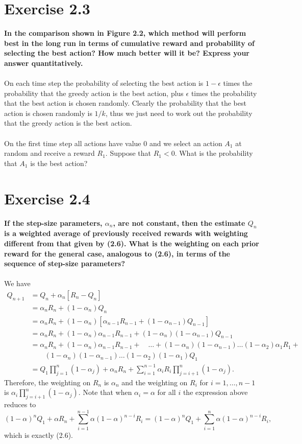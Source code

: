 \documentclass[a4paper,11pt]{article}
\numberwithin{equation}{section}
\theoremstyle{remark}
\begin{document}
\section{Exercise 2.3}

\textbf{In the comparison shown in Figure 2.2, which method will perform best in the long run in terms of cumulative reward and probability of selecting the best action? How much better will it be? Express your answer quantitatively.}
\\ \\ 
On each time step the probability of selecting the best action is $1-\epsilon$ times the probability that the greedy action is the best action, plus $\epsilon$ times the probability that the best action is chosen randomly. Clearly the probability that the best action is chosen randomly is $1/k$, thus we just need to work out the probability that the greedy action is the best action. 
\\ \\ 
On the first time step all actions have value 0 and we select an action $A_1$ at random and receive a reward $R_1$. Suppose that $R_1 < 0$. What is the probability that $A_1$ is the best action? 


\section{Exercise 2.4}

\textbf{If the step-size parameters, $\alpha_n$, are not constant, then the estimate $Q_n$ is a weighted average of previously received rewards with weighting different from that given by (2.6). What is the weighting on each prior reward for the general case, analogous to (2.6), in terms of the sequence of step-size parameters?}
\\ \\ 
We have
\begin{align*}
	Q_{n+1} & = Q_n + \alpha_n[R_n - Q_n] \\
			& = \alpha_n R_n + (1-\alpha_n) Q_n \\
			& = \alpha_n R_n + (1-\alpha_n)[\alpha_{n-1} R_{n-1} + (1-\alpha_{n-1}) Q_{n-1}] \\
			& = \alpha_n R_n + (1-\alpha_n)\alpha_{n-1}R_{n-1} + (1-\alpha_n)(1-\alpha_{n-1})Q_{n-1} \\
			& = \alpha_n R_n + (1-\alpha_n)\alpha_{n-1}R_{n-1} + \quad \dots + (1-\alpha_n)(1-\alpha_{n-1})\dots (1-\alpha_2)\alpha_1 R_1 + \\
			& \quad \quad (1-\alpha_n)(1-\alpha_{n-1})\dots (1-\alpha_2)(1-\alpha_1) Q_1 \\
			& = Q_1\prod_{j=1}^{n}(1-\alpha_j) + \alpha_n R_n + \sum_{i=1}^{n-1}\alpha_i R_i \prod_{j=i+1}^{n}(1-\alpha_j).
\end{align*}
Therefore, the weighting on $R_n$ is $\alpha_n$ and the weighting on $R_i$ for $i=1,\dots,n-1$ is $\alpha_i \prod_{j=i+1}^{n}(1-\alpha_j)$. Note that when $\alpha_i = \alpha$ for all $i$ the expression above reduces to
\[
	(1-\alpha)^n Q_1 + \alpha R_n + \sum_{i=1}^{n-1}\alpha(1-\alpha)^{n-i}R_i = (1-\alpha)^n Q_1 + \sum_{i=1}^{n}\alpha(1-\alpha)^{n-i}R_i,
\]
which is exactly (2.6).
\end{document}
